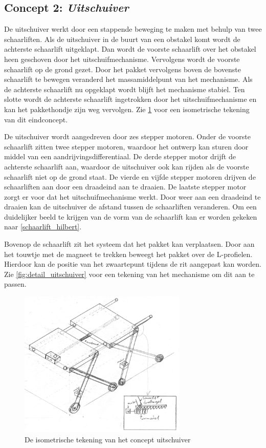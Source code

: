 \subsection{Concept 2: \textit{Uitschuiver}}
\label{se:concept_2_uitschuiver}

De uitschuiver werkt door een stappende beweging te maken met behulp van twee schaarliften. Als de uitschuiver in de buurt van een obstakel komt wordt de achterste schaarlift uitgeklapt. Dan wordt de voorste schaarlift over het obstakel heen geschoven door het uitschuifmechanisme. Vervolgens wordt de voorste schaarlift op de grond gezet. Door het pakket vervolgens boven de bovenste schaarlift te bewegen veranderd het massamiddelpunt van het mechanisme. Als de achterste schaarlift nu opgeklapt wordt blijft het mechanisme stabiel. Ten slotte wordt de achterste schaarlift ingetrokken door het uitschuifmechanisme en kan het pakkethondje zijn weg vervolgen. Zie \cref{fig:isom_uitschuiver} voor een isometrische tekening van dit eindconcept.
\vspace{\baselineskip}

De uitschuiver wordt aangedreven door zes stepper motoren. Onder de voorste schaarlift zitten twee stepper motoren, waardoor het ontwerp kan sturen door middel van een aandrijvingsdifferentiaal. De derde stepper motor drijft de achterste schaarlift aan, waardoor de uitschuiver ook kan rijden als de voorste schaarlift niet op de grond staat. De vierde en vijfde stepper motoren drijven de schaarliften aan door een draadeind aan te draaien. De laatste stepper motor zorgt er voor dat het uitschuifmechanisme werkt. Door weer aan een draadeind te draaien kan de uitschuiver de afstand tussen de schaarliften veranderen. Om een duidelijker beeld te krijgen van de vorm van de schaarlift kan er worden gekeken naar \cref{schaarlift_hilbert}.

Bovenop de schaarlift zit het systeem dat het pakket kan verplaatsen. Door aan het touwtje met de magneet te trekken beweegt het pakket over de L-profielen. Hierdoor kan de positie van het zwaartepunt tijdens de rit aangepast kan worden. Zie \cref{fig:detail_uitschuiver} voor een tekening van het mechanisme om dit aan te passen. 


\begin{figure}[H]
    \centering
    \includegraphics[width=80mm]{04_idee_ontwikkeling/isom_uitschuiver.png}
    \caption{De isometrische tekening van het concept uitschuiver}
    \label{fig:isom_uitschuiver}
\end{figure}

